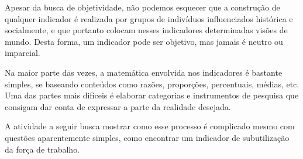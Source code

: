 Apesar da busca de objetividade, não podemos esquecer que a construção de qualquer indicador é realizada por grupos de indivíduos influenciados histórica e socialmente, e que portanto colocam nesses indicadores determinadas visões de mundo. Desta forma, um indicador pode ser objetivo, mas jamais é neutro ou imparcial.

Na maior parte das vezes, a matemática envolvida nos indicadores é bastante simples, se baseando conteúdos como razões, proporções, percentuais, médias, etc. Uma das partes mais difíceis é elaborar categorias e instrumentos de pesquisa que consigam dar conta de expressar a parte da realidade desejada.

A atividade a seguir busca mostrar como esse processo é complicado mesmo com questões aparentemente simples, como encontrar um indicador de subutilização da força de trabalho.

